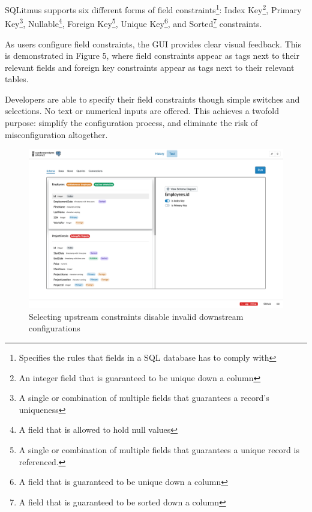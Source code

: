 \documentclass[12pt]{article}
\begin{document}
\begin{spacing}{1.9}
\begin{figure}[H]
		\end{figure}
		
		SQLitmus supports six different forms of field constraints\footnote{Specifies the rules that fields in a SQL database has to comply with}: Index Key\footnote{An integer field that is guaranteed to be unique down a column}, Primary Key\footnote{A single or combination of multiple fields that guarantees a record's uniqueness}, Nullable\footnote{A field that is allowed to hold null values}, Foreign Key\footnote{A single or combination of multiple fields that guarantees a unique record is referenced.}, Unique Key\footnote{A field that is guaranteed to be unique down a column}, and Sorted\footnote{A field that is guaranteed to be sorted down a column} constraints.
		
		As users configure field constraints, the GUI provides clear visual feedback. This is demonstrated in Figure 5, where field constraints appear as tags next to their relevant fields and foreign key constraints appear as tags next to their relevant tables.
		
		Developers are able to specify their field constraints though simple switches and selections. No text or numerical inputs are offered. This achieves a twofold purpose: simplify the configuration process, and eliminate the risk of misconfiguration altogether. 
		
		
		
		
		\begin{figure}[H]
			\centering
			\includegraphics[width=\textwidth]{3-2-1b.png}
			\caption{Selecting upstream constraints disable invalid downstream configurations}
			
		\end{figure}
		

\end{spacing}
\end{document}
